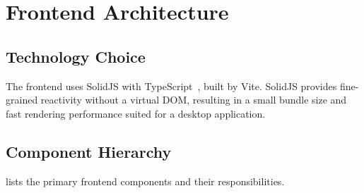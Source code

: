 \documentclass[a4paper, 11pt, oneside]{report}
\begin{document}
\chapter{Frontend Architecture}
\label{ch:frontend}

\section{Technology Choice}
\label{sec:frontend-tech}

The frontend uses SolidJS with TypeScript~\cite{typescript},
built by Vite.  SolidJS provides fine-grained
reactivity without a virtual DOM, resulting in a small bundle size and fast
rendering performance suited for a desktop application.

\section{Component Hierarchy}
\label{sec:component-hierarchy}

 lists the primary frontend components and their
responsibilities.
\end{document}

